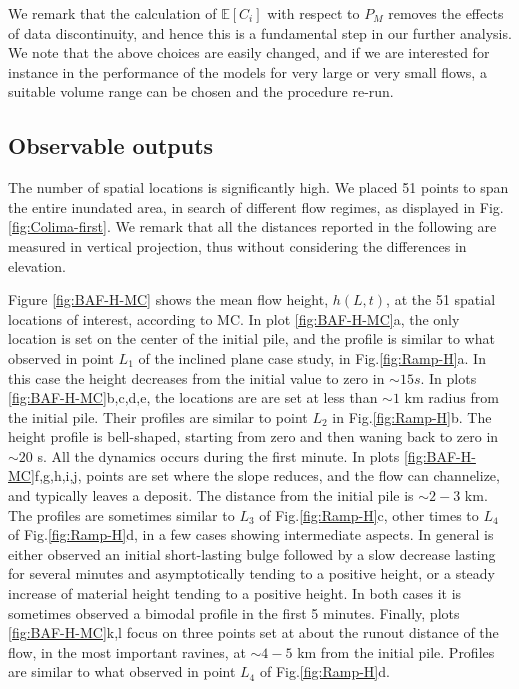 \documentclass{article}
\begin{document}
We remark that the calculation of $\mathbb E[C_i]$ with respect to $P_M$ removes the effects of data discontinuity, and hence this is a fundamental step in our further analysis. We note that the above choices are easily changed, and if we are interested for instance in the performance of the models for very large or very small flows, a suitable volume range can be chosen and the procedure re-run.

\subsection{Observable outputs}
The number of spatial locations is significantly high. We placed 51 points to span the entire inundated area, in search of different flow regimes, as displayed in Fig. \ref{fig:Colima-first}. We remark that all the distances reported in the following are measured in vertical projection, thus without considering the differences in elevation.

Figure \ref{fig:BAF-H-MC} shows the mean flow height, $h(L,t)$, at the 51 spatial locations of interest, according to MC. In plot \ref{fig:BAF-H-MC}a, the only location is set on the center of the initial pile, and the profile is similar to what observed in point $L_1$ of the inclined plane case study, in Fig.\ref{fig:Ramp-H}a. In this case the height decreases from the initial value to zero in $\sim 15 s$. In plots \ref{fig:BAF-H-MC}b,c,d,e, the locations are are set at less than $\sim 1$ km radius from the initial pile. Their profiles are similar to point $L_2$ in Fig.\ref{fig:Ramp-H}b. The height profile is bell-shaped, starting from zero and then waning back to zero in $\sim 20$ s. All the dynamics occurs during the first minute. In plots \ref{fig:BAF-H-MC}f,g,h,i,j, points are set where the slope reduces, and the flow can channelize, and typically leaves a deposit. The distance from the initial pile is $\sim 2-3$ km. The profiles are sometimes similar to $L_3$ of Fig.\ref{fig:Ramp-H}c, other times to $L_4$ of Fig.\ref{fig:Ramp-H}d, in a few cases showing intermediate aspects. In general is either observed an initial short-lasting bulge followed by a slow decrease lasting for several minutes and asymptotically tending to a positive height, or a steady increase of material height tending to a positive height. In both cases it is sometimes observed a bimodal profile in the first 5 minutes. Finally, plots \ref{fig:BAF-H-MC}k,l focus on three points set at about the runout distance of the flow, in the most important ravines, at $\sim 4-5$ km from the initial pile. Profiles are similar to what observed in point $L_4$ of Fig.\ref{fig:Ramp-H}d.
\end{document}
